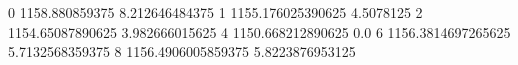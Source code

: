 0 1158.880859375 8.212646484375
1 1155.176025390625 4.5078125
2 1154.65087890625 3.982666015625
4 1150.668212890625 0.0
6 1156.3814697265625 5.7132568359375
8 1156.4906005859375 5.8223876953125
